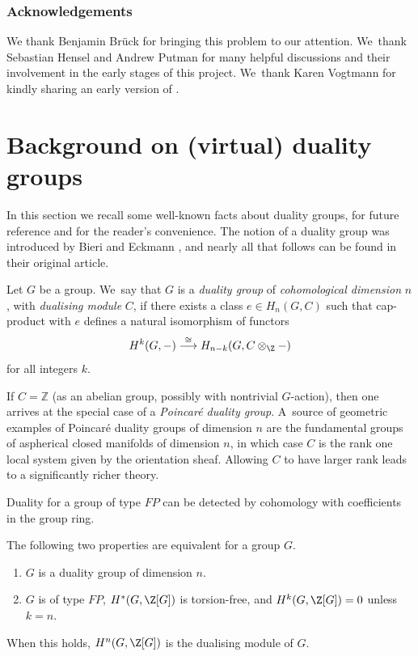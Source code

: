 \subsubsection*{Acknowledgements}
We thank Benjamin Brück for bringing this problem to our attention. We~thank Sebastian Hensel and Andrew Putman for many helpful discussions and their involvement in the early stages of this project. We~thank Karen Vogtmann for kindly sharing an early version of \cite{vogtmann}.

\section{Background on (virtual) duality groups}

In this section we recall some well-known facts about duality groups, for future reference and for the reader's convenience. The notion of a duality group was introduced by Bieri and Eckmann \cite{be}, and nearly all that follows can be found in their original article.

\begin{defn}
Let $G$ be a group. We~say that $G$ is a \emph{duality group} of \emph{cohomological dimension} $n$, with \emph{dualising module} $C$, if there exists a class $e \in H_n(G,C)$ such that cap-product with $e$ defines a natural isomorphism of functors\enlargethispage{.5\baselineskip}
\[
H^k(G,-) \stackrel \cong \longrightarrow H_{n-k}(G,C \otimes_\Z - )
\]
for all integers $k$.
\end{defn}

\begin{rem}If $C=\mathbb{Z}$ (as an abelian group, possibly with nontrivial $G$-action), then one arrives at the special case of a \emph{Poincaré duality group}. A~source of geometric examples of Poincaré duality groups of dimension $n$ are the fundamental groups of aspherical closed manifolds of dimension $n$, in which case $C$ is the rank one local system given by the orientation sheaf. Allowing $C$ to have larger rank leads to a significantly richer theory. \end{rem}

Duality for a group of type $\mathit{FP}$ can be detected by cohomology with coefficients in the group ring.

\pagebreak[2]

\begin{thm}\label{b-e criterion}
The following two properties are equivalent for a group $G$.
\begin{enumerate}
\item\label{b-e criterion1} $G$ is a duality group of dimension $n$.
\item\label{b-e criterion2} $G$ is of type $\mathit{FP}$, $H^*(G,\Z[G])$ is torsion-free, and $H^k(G,\Z[G])=0$ unless $k=n$.
\end{enumerate}
When this holds, $H^n(G,\Z[G])$ is the dualising module of $G$.
\end{thm}

